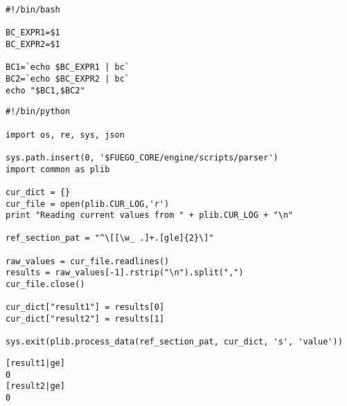 \begin{lstlisting}[label=bc-device,caption=\texttt{bc-device.sh} file]
#!/bin/bash

BC_EXPR1=$1
BC_EXPR2=$1

BC1=`echo $BC_EXPR1 | bc`
BC2=`echo $BC_EXPR2 | bc`
echo "$BC1,$BC2"
\end{lstlisting}

\begin{lstlisting}[label=bc-parser,caption=\texttt{parser.py} file]
#!/bin/python

import os, re, sys, json

sys.path.insert(0, '$FUEGO_CORE/engine/scripts/parser') 
import common as plib

cur_dict = {}
cur_file = open(plib.CUR_LOG,'r')
print "Reading current values from " + plib.CUR_LOG + "\n"

ref_section_pat = "^\[[\w_ .]+.[gle]{2}\]"

raw_values = cur_file.readlines()
results = raw_values[-1].rstrip("\n").split(",")
cur_file.close()

cur_dict["result1"] = results[0]
cur_dict["result2"] = results[1]

sys.exit(plib.process_data(ref_section_pat, cur_dict, 's', 'value'))
\end{lstlisting}

\begin{lstlisting}[label=bc-reference,caption=\texttt{reference.log} file]
[result1|ge]
0
[result2|ge]
0
\end{lstlisting}


